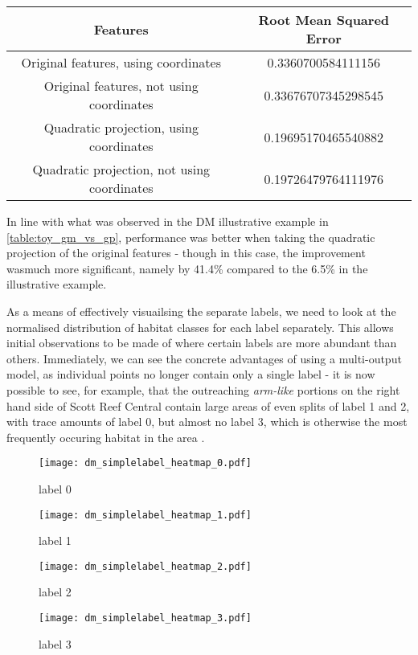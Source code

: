 \begin{tabular}{|c|c|}
    \hline
        Features & Root Mean Squared Error \\\hline
        Original features, using coordinates & 0.3360700584111156 \\
        Original features, not using coordinates & 0.33676707345298545 \\
        Quadratic projection, using coordinates & 0.19695170465540882 \\
        Quadratic projection, not using coordinates & 0.19726479764111976 \\
    \hline
\end{tabular}

In line with what was observed in the DM illustrative example in \autoref{table:toy_gm_vs_gp}, performance was better when taking the quadratic projection of the original features - though in this case, the improvement wasmuch more significant, namely by 41.4\% compared to the 6.5\% in the illustrative example.

As a means of effectively visuailsing the separate labels, we need to look at the normalised distribution of habitat classes for each label separately. This allows initial observations to be made of where certain labels are more abundant than others. Immediately, we can see the concrete advantages of using a multi-output model, as individual points no longer contain only a single label - it is now possible to see, for example, that the outreaching \textit{arm-like} portions on the right hand side of Scott Reef Central contain large areas of even splits of label 1 and 2, with trace amounts of label 0, but almost no label 3, which is otherwise the most frequently occuring habitat in the area .

\begin{figure}[H]
    \begin{minipage}{.45\linewidth}
        \centerline{\texttt{[image: dm\_simplelabel\_heatmap\_0.pdf]}}
        \caption{label 0}
        \label{fig:dm_sl_hm_0}
    \end{minipage}
    \hfill
    \begin{minipage}{.45\linewidth}
        \texttt{[image: dm\_simplelabel\_heatmap\_1.pdf]}
        \caption{label 1}
        \label{fig:dm_sl_hm_1}
    \end{minipage}
    \begin{minipage}{.45\linewidth}
        \centerline{\texttt{[image: dm\_simplelabel\_heatmap\_2.pdf]}}
        \caption{label 2}
        \label{fig:dm_sl_hm_2}
    \end{minipage}
    \hfill
    \begin{minipage}{.45\linewidth}
        \texttt{[image: dm\_simplelabel\_heatmap\_3.pdf]}
        \caption{label 3}
        \label{fig:dm_sl_hm_3}
    \end{minipage}

\end{figure}

